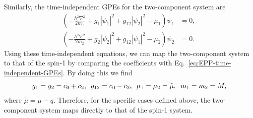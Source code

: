 Similarly, the time-independent GPEs for the two-component system are
\begin{equation}
    \begin{aligned}
        \left(-\frac{\hbar^2\nabla^2}{2m_1} + g_1|\psi_1|^2
        +g_{12}|\psi_2|^2 - \mu_1\right)\psi_1 &= 0, \\
        \left(-\frac{\hbar^2\nabla^2}{2m_2} + g_2|\psi_2|^2
        +g_{12}|\psi_1|^2 - \mu_2\right)\psi_2 &= 0.
    \end{aligned}
    \label{eq:two-comp-time-independent-gpes}
\end{equation}
Using these time-independent equations, we can map the two-component system
to that of the spin-1 by comparing the coefficients with
Eq.~\eqref{eq:EPP-time-independent-GPEs}.
By doing this we find
\begin{equation}
    g_1=g_2=c_0+c_2, \enskip g_{12} = c_0-c_2, \enskip \mu_1=\mu_2=\tilde{\mu}, 
    \enskip m_1=m_2=M,
\end{equation}
where $\tilde{\mu} = \mu - q$.
Therefore, for the specific cases defined above, the two-component system maps
directly to that of the spin-1 system.

